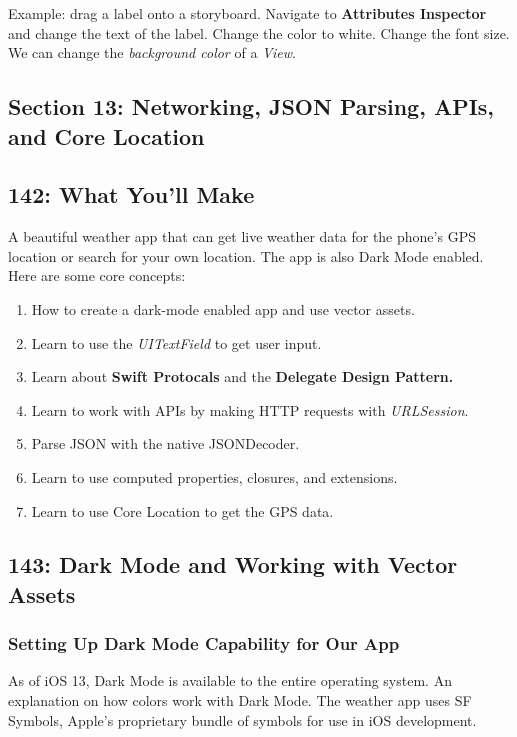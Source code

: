 \documentclass[12pt, letterpaper]{article}
\begin{document}
Example: drag a label onto a storyboard. Navigate to \textbf{Attributes Inspector} and change the
text of the label. Change the color to white. Change the font size. We can change the \emph{background
color} of a \emph{View}.

\subsection*{Section 13: Networking, JSON Parsing, APIs, and Core Location}

\subsection*{142: What You'll Make}

A beautiful weather app that can get live weather data for the phone's GPS location or search for your own location.
The app is also Dark Mode enabled. Here are some core concepts:

\begin{enumerate}
    \itemsep0em
    \item{How to create a dark-mode enabled app and use vector assets.}
    \item{Learn to use the \emph{UITextField} to get user input.}
    \item{Learn about \textbf{Swift Protocals} and the \textbf{Delegate Design Pattern.}}
    \item{Learn to work with APIs by making HTTP requests with \emph{URLSession}.}
    \item{Parse JSON with the native JSONDecoder.}
    \item{Learn to use computed properties, closures, and extensions.}
    \item{Learn to use Core Location to get the GPS data.}
\end{enumerate}

\subsection*{143: Dark Mode and Working with Vector Assets}

\subsubsection*{Setting Up Dark Mode Capability for Our App}

As of iOS 13, Dark Mode is available to the entire operating system. An explanation on how colors work with Dark Mode.
The weather app uses SF Symbols, Apple's proprietary bundle of symbols for use in iOS development. \\
\end{document}
